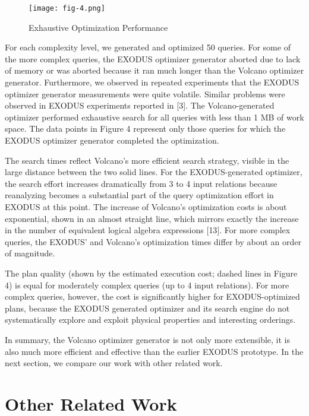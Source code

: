 \documentclass[a4paper,12pt,notitlepage,twoside,openright]{article}
\begin{document}
\begin{figure}
  \centering
  \texttt{[image: fig-4.png]}
  \caption{Exhaustive Optimization Performance}
\end{figure}

For each complexity level, we generated and optimized 50 queries. For
some of the more complex queries, the EXODUS optimizer generator aborted
due to lack of memory or was aborted because it ran much longer than the
Volcano optimizer generator. Furthermore, we observed in repeated
experiments that the EXODUS optimizer generator measurements were quite
volatile. Similar problems were observed in EXODUS experiments reported
in {[}3{]}. The Volcano-generated optimizer performed exhaustive search
for all queries with less than 1 MB of work space. The data points in
Figure 4 represent only those queries for which the EXODUS optimizer
generator completed the optimization.

The search times reflect Volcano's more efficient search strategy,
visible in the large distance between the two solid lines. For the
EXODUS-generated optimizer, the search effort increases dramatically
from 3 to 4 input relations because reanalyzing becomes a substantial
part of the query optimization effort in EXODUS at this point. The
increase of Volcano's optimization costs is about exponential, shown in
an almost straight line, which mirrors exactly the increase in the
number of equivalent logical algebra expressions {[}13{]}. For more
complex queries, the EXODUS' and Volcano's optimization times differ by
about an order of magnitude.

The plan quality (shown by the estimated execution cost; dashed lines in
Figure 4) is equal for moderately complex queries (up to 4 input
relations). For more complex queries, however, the cost is significantly
higher for EXODUS-optimized plans, because the EXODUS generated
optimizer and its search engine do not systematically explore and
exploit physical properties and interesting orderings.

In summary, the Volcano optimizer generator is not only more extensible,
it is also much more efficient and effective than the earlier EXODUS
prototype. In the next section, we compare our work with other related
work.

\hypertarget{other-related-work}{%
\section{Other Related Work}\label{other-related-work}}
\end{document}
